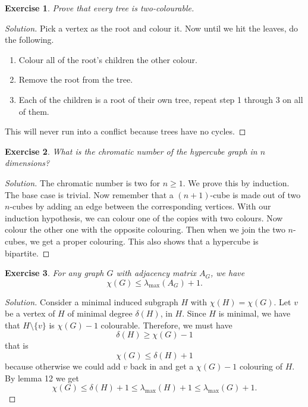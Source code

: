\documentclass[a4paper]{article}
\newtheorem{exercise}{Exercise}
\newenvironment{solution}{\begin{proof}[Solution]\renewcommand{\qedsymbol}{}\ignorespaces}{\end{proof}}
\begin{document}
\begin{exercise}
Prove that every tree is two-colourable.
\end{exercise}

\begin{solution}
Pick a vertex as the root and colour it.
Now until we hit the leaves, do the following.
\begin{enumerate}
	\item Colour all of the root's children the other colour.
	\item Remove the root from the tree.
	\item Each of the children is a root of their own tree, repeat step 1 through 3 on all of them.
\end{enumerate}
This will never run into a conflict because trees have no cycles.
\end{solution}

\begin{exercise}
What is the chromatic number of the hypercube graph in \(n\) dimensions?
\end{exercise}

\begin{solution}
The chromatic number is two for \(n \geq 1\).
We prove this by induction.
The base case is trivial.
Now remember that a \((n + 1)\)-cube is made out of two \(n\)-cubes by adding an edge between the corresponding vertices.
With our induction hypothesis, we can colour one of the copies with two colours.
Now colour the other one with the opposite colouring.
Then when we join the two \(n\)-cubes, we get a proper colouring.
This also shows that a hypercube is bipartite.
\end{solution}

\begin{exercise}
For any graph \(G\) with adjacency matrix \(A_G\), we have
\[
	\chi(G) \leq \lambda_\text{max}(A_G) + 1.
\]
\end{exercise}

\begin{solution}
Consider a minimal induced subgraph \(H\) with \(\chi(H) = \chi(G)\).
Let \(v\) be a vertex of \(H\) of minimal degree \(\delta(H)\), in \(H\).
Since \(H\) is minimal, we have that \(H \setminus \{v\}\) is \(\chi(G) - 1\) colourable.
Therefore, we must have
\[
	\delta(H) \geq \chi(G) - 1
\]
that is
\[
	\chi(G) \leq \delta(H) + 1
\]
because otherwise we could add \(v\) back in and get a \(\chi(G) - 1\) colouring of \(H\).
By lemma 12 we get
\[
	\chi(G)
	\leq \delta(H) + 1
	\leq \lambda_\text{max}(H) + 1
	\leq \lambda_\text{max}(G) + 1.
\]
\end{solution}
\end{document}
